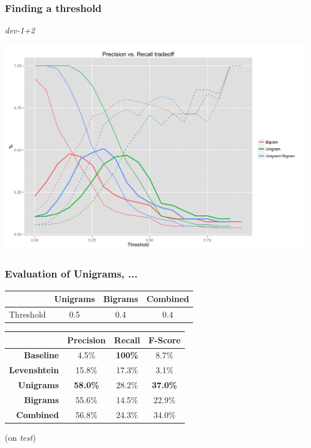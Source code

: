 \documentclass[table]{beamer}
\begin{document}
\begin{frame}
  \frametitle{Finding a threshold}
  \center\textit{dev-1+2}

  \quad\includegraphics[scale=0.09]{a.png}
\end{frame}

\begin{frame}
  \frametitle{Evaluation of \textbf{Unigrams}, ...}
  \begin{tabular}{r|c|c|c|}
    & \textbf{Unigrams} & \textbf{Bigrams} & \textbf{Combined}\\
  \hline
  Threshold & 0.5 & 0.4 & 0.4
  \end{tabular}
  \vspace{1cm}

  \begin{tabular}{r|c|c|c|}
  & Precision & Recall & F-Score \\
  \hline
  \textbf{Baseline} & 4.5\% & \textbf{100\%} & 8.7\% \\
  \hline
  \textbf{Levenshtein} & 15.8\% & 17.3\% & 3.1\% \\
  \hline
  \textbf{Unigrams} & \textbf{58.0\%} & 28.2\% & \textbf{37.0\%} \\
  \hline
  \textbf{Bigrams} & 55.6\% & 14.5\% & 22.9\% \\
  \hline
  \textbf{Combined} & 56.8\% & 24.3\% & 34.0\% \\
  \hline
  \end{tabular}
  \vspace{0.5cm}

  (on \textit{test})
\end{frame}
\end{document}
